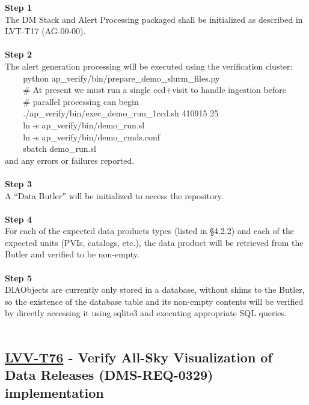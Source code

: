 \textbf{Step 1}\\
The DM Stack and Alert Processing packaged shall be initialized as
described in LVT-T17 (AG-00-00).\\
~\\
\textbf{Step 2}\\
The alert generation processing will be executed using the verification
cluster:\\
\hspace*{0.333em} ~ ~ ~python
ap\_verify/bin/prepare\_demo\_slurm\_files.py\\
\hspace*{0.333em} ~ ~ ~\# At present we must run a single ccd+visit to
handle ingestion before\\
\hspace*{0.333em} ~ ~ ~\# parallel processing can begin\\
\hspace*{0.333em} ~ ~ ~./ap\_verify/bin/exec\_demo\_run\_1ccd.sh 410915
25\\
\hspace*{0.333em} ~ ~ ~ln -s ap\_verify/bin/demo\_run.sl\\
\hspace*{0.333em} ~ ~ ~ln -s ap\_verify/bin/demo\_cmds.conf\\
\hspace*{0.333em} ~ ~ ~sbatch demo\_run.sl\\
and any errors or failures reported.\\
~\\
\textbf{Step 3}\\
A ``Data Butler'' will be initialized to access the repository.\\
~\\
\textbf{Step 4}\\
For each of the expected data products types (listed in §4.2.2) and each
of the expected units (PVIs, catalogs, etc.), the data product will be
retrieved from the Butler and verified to be non-empty.\\
~\\
\textbf{Step 5}\\
DIAObjects are currently only stored in a database, without shims to the
Butler, so the existence of the database table and its non-empty
contents will be verified by directly accessing it using sqlite3 and
executing appropriate SQL queries.\\
~\\

\hypertarget{lvv-t76---verify-all-sky-visualization-of-data-releases-dms-req-0329-implementation}{%
\subsection{\texorpdfstring{\href{https://jira.lsstcorp.org/secure/Tests.jspa\#/testCase/LVV-T76}{LVV-T76}
- Verify All-Sky Visualization of Data Releases (DMS-REQ-0329)
implementation}{LVV-T76 - Verify All-Sky Visualization of Data Releases (DMS-REQ-0329) implementation}}\label{lvv-t76---verify-all-sky-visualization-of-data-releases-dms-req-0329-implementation}}

